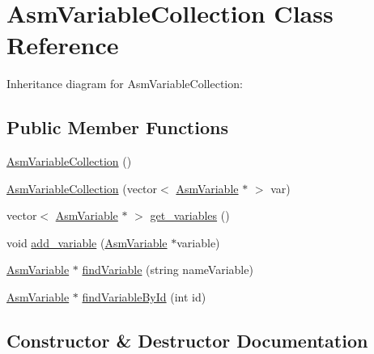 \hypertarget{class_asm_variable_collection}{}\section{Asm\+Variable\+Collection Class Reference}
\label{class_asm_variable_collection}


Inheritance diagram for Asm\+Variable\+Collection\+:
\subsection*{Public Member Functions}
\begin{DoxyCompactItemize}
\item 
\hyperlink{class_asm_variable_collection_a7cf2eff68a8d5e64dbbf916edf00bb7f}{Asm\+Variable\+Collection} ()
\item 
\hyperlink{class_asm_variable_collection_ae774f2696fd406a7da158191d05c968c}{Asm\+Variable\+Collection} (vector$<$ \hyperlink{class_asm_variable}{Asm\+Variable} $\ast$ $>$ var)
\item 
vector$<$ \hyperlink{class_asm_variable}{Asm\+Variable} $\ast$ $>$ \hyperlink{class_asm_variable_collection_aef531794c7134ef0e776b6d6041cb595}{get\+\_\+variables} ()
\item 
void \hyperlink{class_asm_variable_collection_aba63e3f25ffb44f6b116bbc80610f770}{add\+\_\+variable} (\hyperlink{class_asm_variable}{Asm\+Variable} $\ast$variable)
\item 
\hyperlink{class_asm_variable}{Asm\+Variable} $\ast$ \hyperlink{class_asm_variable_collection_a03351a06f7d6c80dc99d63bb0549955d}{find\+Variable} (string name\+Variable)
\item 
\hyperlink{class_asm_variable}{Asm\+Variable} $\ast$ \hyperlink{class_asm_variable_collection_a9e9f72e1b60e7b55e3ad1752aff5ced1}{find\+Variable\+By\+Id} (int id)
\end{DoxyCompactItemize}


\subsection{Constructor \& Destructor Documentation}
